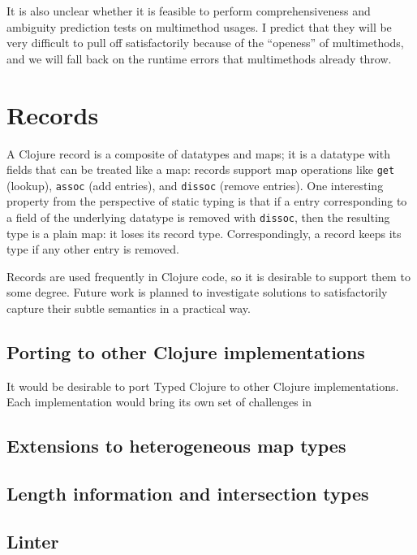 It is also unclear whether it is feasible to perform comprehensiveness and
ambiguity prediction tests on multimethod usages. I predict that they will be
very difficult to pull off satisfactorily because of the ``openess'' of multimethods,
and we will fall back on the runtime errors that multimethods already throw.

\section{Records}

A Clojure record is a composite of datatypes and maps; it is a datatype
with fields that can be treated like a map: records support map operations like \lstinline|get| (lookup),
\lstinline|assoc| (add entries), and \lstinline|dissoc| (remove entries).
One interesting property from the perspective of static typing is that if
a entry corresponding to a field of the underlying datatype is removed
with \lstinline|dissoc|, then the resulting type is a plain map: it loses
its record type.
Correspondingly, a record keeps its type if any other entry is removed.

Records are used frequently in Clojure code, so it is desirable
to support them to some degree. Future work is planned to investigate solutions
to satisfactorily capture their subtle semantics in a practical way.

\subsection{Porting to other Clojure implementations}

It would be desirable to port Typed Clojure to other Clojure implementations.
Each implementation would bring its own set of challenges in

\subsection{Extensions to heterogeneous map types}

\subsection{Length information and intersection types}


\subsection{Linter}
